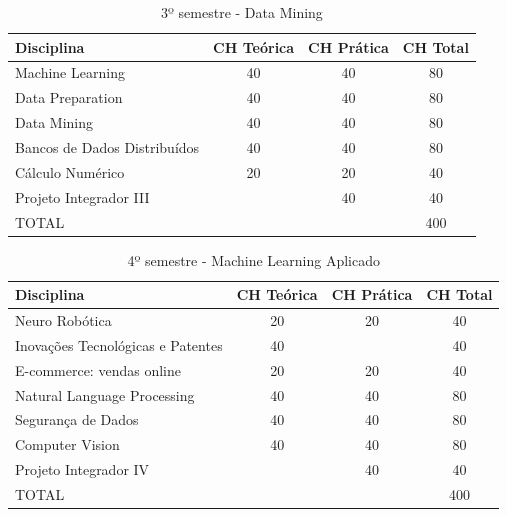 \documentclass[a4paper, 12pt, openright, oneside, german, french, english, brazil]{abntex2}
\begin{document}
\begin{table}[!h]
  \centering
  \footnotesize
  \caption{3º semestre - Data Mining}
  \label{3sem}
  \begin{tabular}{|p{6cm}|c|c|c|}
    \hline
    \textbf{Disciplina} & CH Teórica & CH Prática & CH Total \\
    \hline
    Machine Learning & 40 & 40 & 80 \\
    \hline
    Data Preparation & 40 & 40 & 80 \\
    \hline
    Data Mining & 40 & 40 & 80 \\
    \hline
    Bancos de Dados Distribuídos & 40 & 40 & 80 \\
    \hline
    Cálculo Numérico & 20 & 20 & 40 \\
    \hline
    Projeto Integrador III & & 40 & 40 \\
    \hline
    TOTAL & & & 400 \\
    \hline
  \end{tabular}
\end{table}


\begin{table}[!h]
  \centering
  \footnotesize
  \caption{4º semestre - Machine Learning Aplicado}
  \label{4sem}
  \begin{tabular}{|p{6cm}|c|c|c|}
    \hline
    \textbf{Disciplina} & CH Teórica & CH Prática & CH Total \\
    \hline
    Neuro Robótica & 20 & 20 & 40 \\
    \hline
    Inovações Tecnológicas e Patentes & 40 & & 40 \\
    \hline
    E-commerce: vendas online & 20 & 20 & 40 \\
    \hline
    Natural Language Processing & 40 & 40 & 80 \\
    \hline
    Segurança de Dados & 40 & 40 & 80 \\
    \hline
    Computer Vision & 40 & 40 & 80 \\
    \hline
    Projeto Integrador IV & & 40 & 40 \\
    \hline
    TOTAL & & & 400 \\
    \hline
  \end{tabular}
\end{table}
\end{document}
